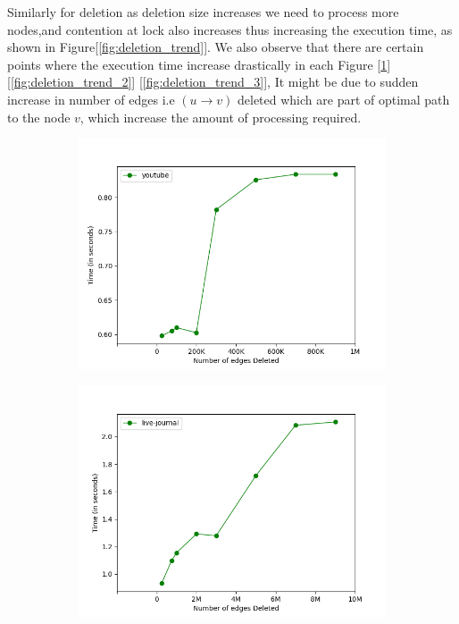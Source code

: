 \documentclass[a4paper]{article}
\begin{document}
Similarly for deletion as deletion size increases we need to process more nodes,and contention at lock also increases thus increasing the execution time, as shown in Figure[\ref{fig:deletion_trend}]. We also observe that there are certain points where the execution time increase drastically in each Figure [\ref{fig:deletion_trend_1}] [\ref{fig:deletion_trend_2}] [\ref{fig:deletion_trend_3}], It might be due to sudden increase in number of edges i.e $(u \rightarrow v)$ deleted which are part of optimal path to the node $v$, which increase the amount of processing required.
\begin{figure}[H]
    \centering
    \begin{subfigure}[b]{0.32\textwidth}
         \centering
         \includegraphics[width=\textwidth]{img/del/d1.png}
         \caption{}
         \label{fig:deletion_trend_1}
    \end{subfigure}
    \hfill
    \begin{subfigure}[b]{0.32\textwidth}
         \centering
         \includegraphics[width=\textwidth]{img/del/d2.png}

\end{subfigure}
\end{figure}
\end{document}
